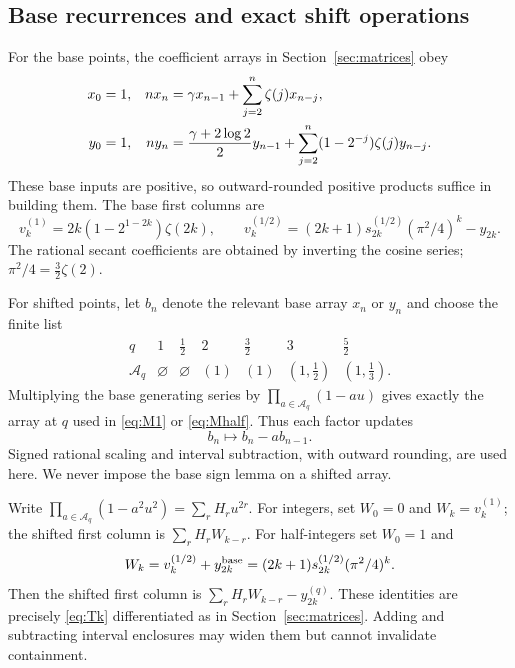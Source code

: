 \documentclass[11pt,a4paper]{article}
\theoremstyle{definition}\newtheorem{definition}[theorem]{Definition}
\theoremstyle{remark}\newtheorem{remark}[theorem]{Remark}
\begin{document}
\subsection{Base recurrences and exact shift operations}
For the base points, the coefficient arrays in Section~\ref{sec:matrices} obey
\begin{align}\label{eq:coefrec}
x_0&=1,& nx_n&=\gamma x_{n-1}+\sum_{j=2}^n\zeta(j)x_{n-j},\notag\\
y_0&=1,& ny_n&=\frac{\gamma+2\log2}{2}y_{n-1}
+\sum_{j=2}^n(1-2^{-j})\zeta(j)y_{n-j}.
\end{align}
These base inputs are positive, so outward-rounded positive products suffice in building them. The base first columns are
\[
v_k^{(1)}=2k(1-2^{1-2k})\zeta(2k),\qquad
v_k^{(1/2)}=(2k+1)s_{2k}^{(1/2)}(\pi^2/4)^k-y_{2k}.
\]
The rational secant coefficients are obtained by inverting the cosine series; $\pi^2/4=\tfrac32\zeta(2)$.

For shifted points, let $b_n$ denote the relevant base array $x_n$ or $y_n$ and choose the finite list
\[
\begin{array}{c|cccccc}
q&1&\tfrac12&2&\tfrac32&3&\tfrac52\\ \hline
\mathcal A_q&\varnothing&\varnothing&(1)&(1)&(1,\tfrac12)&(1,\tfrac13).
\end{array}
\]
Multiplying the base generating series by $\prod_{a\in\mathcal A_q}(1-au)$ gives exactly the array at $q$ used in \eqref{eq:M1} or \eqref{eq:Mhalf}. Thus each factor updates
\[
b_n\longmapsto b_n-a b_{n-1}.
\]
Signed rational scaling and interval subtraction, with outward rounding, are used here. We never impose the base sign lemma on a shifted array.

Write $\prod_{a\in\mathcal A_q}(1-a^2u^2)=\sum_r H_r u^{2r}$. For integers, set $W_0=0$ and $W_k=v_k^{(1)}$; the shifted first column is $\sum_r H_r W_{k-r}$. For half-integers set $W_0=1$ and
\[
W_k=v_k^{(1/2)}+y_{2k}^{\rm base}
=(2k+1)s_{2k}^{(1/2)}(\pi^2/4)^k.
\]
Then the shifted first column is $\sum_r H_rW_{k-r}-y_{2k}^{(q)}$. These identities are precisely \eqref{eq:Tk} differentiated as in Section~\ref{sec:matrices}. Adding and subtracting interval enclosures may widen them but cannot invalidate containment.
\end{document}

